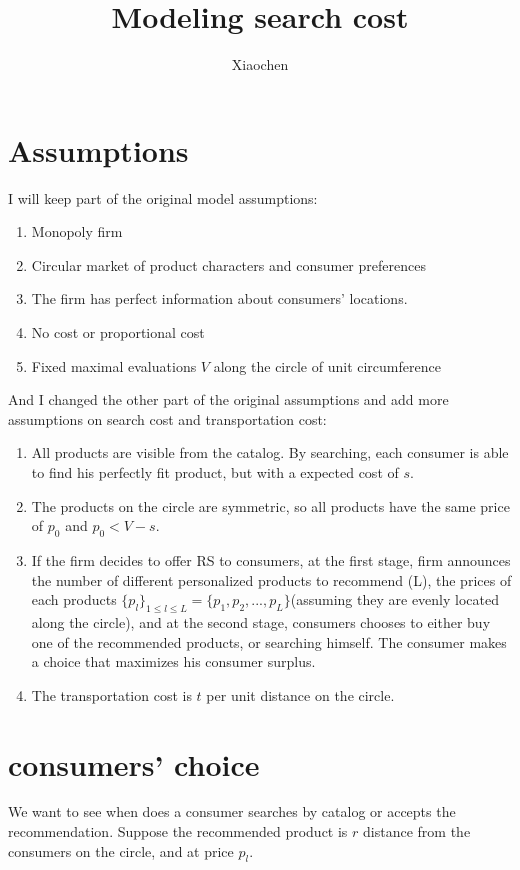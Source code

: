 \documentclass[11pt, oneside]{article}   	%
\title{Modeling search cost}
\author{Xiaochen}
\begin{document}
\maketitle
\section{Assumptions}
I will keep part of the original model assumptions:
\begin{enumerate}
\item Monopoly firm
\item Circular market of product characters and consumer preferences
\item The firm has perfect information about consumers' locations.
\item No cost or proportional cost
\item Fixed maximal evaluations $V$ along the circle of unit circumference
\end{enumerate}

\noindent And I changed the other part of the original assumptions and add more assumptions on search cost and transportation cost:
\begin{enumerate}
\item All products are visible from the catalog. By searching, each consumer is able to find his perfectly fit product, but with a expected cost of $s$.
\item The products on the circle are symmetric, so all products have the same price of $p_0$ and $p_0 < V - s$.
\item If the firm decides to offer RS to consumers, at the first stage, firm announces the number of different personalized products to recommend (L), the prices of each products $\{p_l\}_{1\leq l\leq L} = \{p_1,p_2,...,p_L\}$(assuming they are evenly located along the circle), and at the second stage, consumers chooses to either buy one of the recommended products, or searching himself. The consumer makes a choice that maximizes his consumer surplus.
\item The transportation cost is $t$ per unit distance on the circle.
\end{enumerate}
\section{consumers' choice}
We want to see when does a consumer searches by catalog or accepts the recommendation. Suppose the recommended product is $r$ distance from the consumers on the circle, and at price $p_l$.
\end{document}
